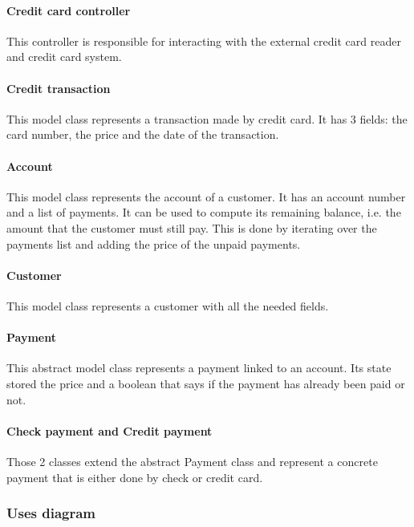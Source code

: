\paragraph{Credit card controller}
This controller is responsible for interacting with the external credit card reader and credit card system. 

\paragraph{Credit transaction}
This model class represents a transaction made by credit card. It has 3 fields: the card number, the price and the date of the transaction.

\paragraph{Account}
This model class represents the account of a customer. It has an account number and a list of payments. It can be used to compute its remaining balance, i.e. the amount that the customer must still pay. This is done by iterating over the payments list and adding the price of the unpaid payments.

\paragraph{Customer}
This model class represents a customer with all the needed fields.

\paragraph{Payment}
This abstract model class represents a payment linked to an account. Its state stored the price and a boolean that says if the payment has already been paid or not.

\paragraph{Check payment and Credit payment}
Those 2 classes extend the abstract Payment class and represent a concrete payment that is either done by check or credit card.


\subsubsection{Uses diagram}

